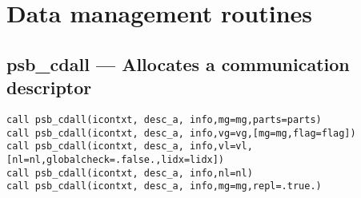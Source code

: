 \section{Data management routines}
\label{sec:toolsrout}


%
%
\subsection{psb\_cdall --- Allocates a communication descriptor}

\begin{verbatim}
call psb_cdall(icontxt, desc_a, info,mg=mg,parts=parts)
call psb_cdall(icontxt, desc_a, info,vg=vg,[mg=mg,flag=flag])
call psb_cdall(icontxt, desc_a, info,vl=vl,[nl=nl,globalcheck=.false.,lidx=lidx])
call psb_cdall(icontxt, desc_a, info,nl=nl)
call psb_cdall(icontxt, desc_a, info,mg=mg,repl=.true.)
\end{verbatim}

